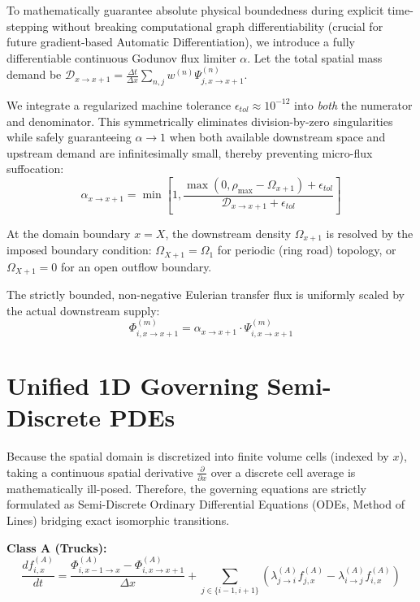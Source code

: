 \documentclass[11pt,a4paper]{article}
\begin{document}
To mathematically guarantee absolute physical boundedness during explicit time-stepping without breaking computational graph differentiability (crucial for future gradient-based Automatic Differentiation), we introduce a fully differentiable continuous Godunov flux limiter $\alpha$. Let the total spatial mass demand be $\mathcal{D}_{x\rightarrow x+1} = \frac{\Delta t}{\Delta x} \sum_{n, j} w^{(n)} \Psi_{j,x\rightarrow x+1}^{(n)}$.

We integrate a regularized machine tolerance $\epsilon_{tol} \approx 10^{-12}$ into \textit{both} the numerator and denominator. This symmetrically eliminates division-by-zero singularities while safely guaranteeing $\alpha \to 1$ when both available downstream space and upstream demand are infinitesimally small, thereby preventing micro-flux suffocation:
\begin{equation}
\alpha_{x\rightarrow x+1} = \min \left[ 1, \frac{\max(0, \rho_{\max} - \Omega_{x+1}) + \epsilon_{tol}}{\mathcal{D}_{x\rightarrow x+1} + \epsilon_{tol}} \right]
\end{equation}

At the domain boundary $x = X$, the downstream density $\Omega_{x+1}$ is resolved by the imposed boundary condition: $\Omega_{X+1} = \Omega_1$ for periodic (ring road) topology, or $\Omega_{X+1} = 0$ for an open outflow boundary.

The strictly bounded, non-negative Eulerian transfer flux is uniformly scaled by the actual downstream supply:
\begin{equation}
\Phi_{i,x\rightarrow x+1}^{(m)} = \alpha_{x\rightarrow x+1} \cdot \Psi_{i,x\rightarrow x+1}^{(m)}
\end{equation}

\section{Unified 1D Governing Semi-Discrete PDEs}
Because the spatial domain is discretized into finite volume cells (indexed by $x$), taking a continuous spatial derivative $\frac{\partial}{\partial x}$ over a discrete cell average is mathematically ill-posed. Therefore, the governing equations are strictly formulated as Semi-Discrete Ordinary Differential Equations (ODEs, Method of Lines) bridging exact isomorphic transitions.

\textbf{Class A (Trucks):}
\begin{equation}
\frac{d f_{i,x}^{(A)}}{dt} = \frac{\Phi_{i,x-1\rightarrow x}^{(A)} - \Phi_{i,x\rightarrow x+1}^{(A)}}{\Delta x} + \sum_{j\in\{i-1,i+1\}} \left( \lambda_{j\rightarrow i}^{(A)} f_{j,x}^{(A)} - \lambda_{i\rightarrow j}^{(A)} f_{i,x}^{(A)} \right)
\end{equation}
\end{document}
